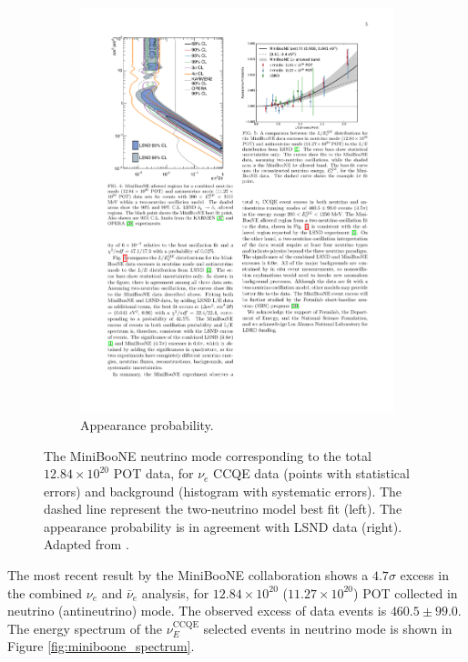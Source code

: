 \begin{figure}[htbp]
\begin{subfigure}{0.48\textwidth}
\begin{center}
    \includegraphics[width=\linewidth]{figures/miniboone_lsnd.pdf}
    \caption{Appearance probability.}
    \label{fig:miniboone_lsnd}
    \end{center}
  \end{subfigure}
  \caption{The MiniBooNE neutrino mode corresponding to the total $12.84\times10^{20}$ POT data, for $\nu_e$ CCQE data (points with statistical errors) and background (histogram with systematic errors). The dashed line represent the two-neutrino model best fit (left). The appearance probability is in agreement with LSND data (right). Adapted from \cite{Aguilar-Arevalo:2018gpe}.}
\end{figure}


The most recent result by the MiniBooNE collaboration \cite{Aguilar-Arevalo:2018gpe} shows a $4.7\sigma$ excess in the combined $\nu_{e}$ and $\bar{\nu}_{e}$ analysis, for $12.84\times10^{20}$ ($11.27\times10^{20}$) POT collected in neutrino (antineutrino) mode. The observed excess of data events is $460.5 \pm 99.0$. The energy spectrum of the $\nu_E^{\mathrm{CCQE}}$ selected events in neutrino mode is shown in Figure \ref{fig:miniboone_spectrum}. 

